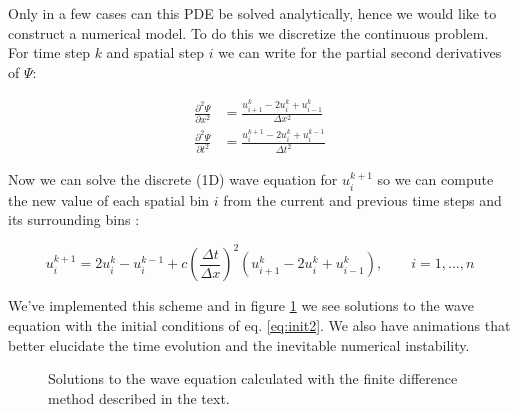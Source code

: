 \documentclass[a4paper]{article}
\begin{document}
Only in a few cases can this PDE be solved analytically, hence we would like to construct a numerical model. To do this we discretize the continuous problem. For time step $k$ and spatial step $i$ we can write for the partial second derivatives of $\Psi$:

\begin{subequations}
\begin{align}
\frac{\partial ^2 \Psi}{\partial  x^2} &= \frac{u^{k}_{i+1} - 2 u^{k}_{i} + u^{k}_{i-1}}{\Delta x^2}\\
\frac{\partial ^2 \Psi}{\partial  t^2} &= \frac{u^{k+1}_{i} - 2 u^{k}_{i} + u^{k-1}_{i}}{\Delta t^2}
\end{align}
\end{subequations}

Now we can solve the discrete (1D) wave equation for $u^{k+1}_{i}$ so we can compute the new value of each spatial bin $i$ from the current and previous time steps and its surrounding bins \cite{sciComp}:

\begin{equation}
u^{k+1}_{i} = 2 u^{k}_{i} - u^{k-1}_{i} + c \left ( \frac{\Delta t}{\Delta x} \right ) ^2 \left ( u^{k}_{i+1} - 2 u^{k}_{i} + u^{k}_{i-1} \right ), \qquad i = 1, ... , n
\end{equation}

We've implemented this scheme and in figure \ref{fig:wave} we see solutions to the wave equation with the initial conditions of eq. \ref{eq:init2}. We also have animations that better elucidate the time evolution and the inevitable numerical instability.

\begin{figure}
\caption{Solutions to the wave equation calculated with the finite difference method described in the text.}
\label{fig:wave}
\end{figure}
\end{document}

